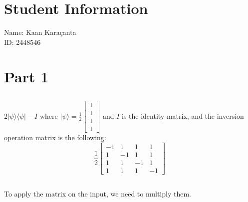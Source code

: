 \documentclass[12pt]{article}
\begin{document}
\section*{Student Information}

Name: Kaan Karaçanta \\

ID: 2448546 \\



\section*{Part 1}

\subsection*{}

$ 2 |\psi \rangle \langle \psi | - I $ where $ |\psi \rangle = \frac{1}{2} \begin{bmatrix} 1 \\ 1 \\ 1 \\ 1 \end{bmatrix} $ and $ I $ is the identity matrix, and the inversion operation matrix is the following:
\[ \frac{1}{2} \begin{bmatrix} -1 & 1 & 1 & 1 \\ 1 & -1 & 1 & 1 \\ 1 & 1 & -1 & 1 \\ 1 & 1 & 1 & -1 \end{bmatrix} \]

\subsection*{}

To apply the matrix on the input, we need to multiply them.  
\end{document}
